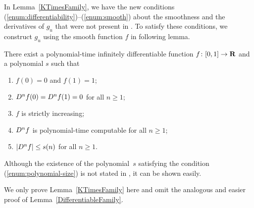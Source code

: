 In Lemma~\ref{KTimesFamily}, 
we have the new conditions (\ref{enum:differentiability})--(\ref{enum:smooth}) 
about the smoothness and the derivatives of $g_u$ 
that were not present in \cite[Lemma 4.1]{kawamura2010lipschitz}.
To satisfy these conditions, we construct $g_u$ 
using the smooth function $f$ in following lemma.

\begin{lemma}
 \label{SmoothFunction}
 There exist a polynomial-time infinitely differentiable function  $f \colon [0,1] \to \mathbf R$ 
 and a polynomial $s$ such that
  \begin{enumerate}
   \item $f(0) = 0$ and $f(1) = 1$;
   \item $D ^n f (0) = D ^n f (1) = 0$ for all $n \ge 1$;
   \item $f$ is strictly increasing;
   \item $D ^n f$ is polynomial-time computable for all $n \ge 1$;
   \item \label{enum:polynomial-size}
	 $|D^n f| \le s(n)$ for all $n \ge 1$. 
  \end{enumerate}
 \end{lemma}

Although the existence of the polynomial~$s$ satisfying the condition (\ref{enum:polynomial-size}) is not stated in \cite[Lemma 3.6]{ko1991complexity},
it can be shown easily.

We only prove Lemma~\ref{KTimesFamily} here
and omit the analogous and easier proof of Lemma~\ref{DifferentiableFamily}.

